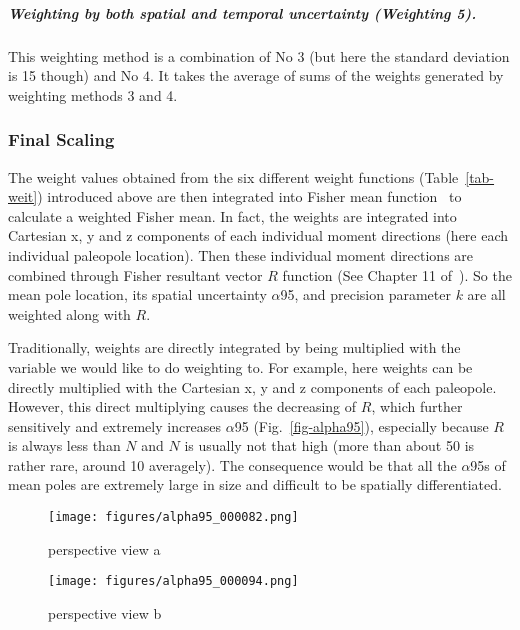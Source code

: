 \subparagraph{Weighting by both spatial and temporal uncertainty (Weighting 5).}
This weighting method is a combination of No $3$ (but here the standard
deviation is 15 though) and No $4$. It takes the average of sums of the weights
generated by weighting methods 3 and 4.

\subsubsection{Final Scaling}

The weight values obtained from the six different weight functions
(Table~\ref{tab-weit}) introduced above are then integrated into Fisher mean
function~\cite{F53} to calculate a weighted Fisher mean. In fact, the weights
are integrated into Cartesian x, y and z components of each individual moment
directions (here each individual paleopole location). Then these individual
moment directions are combined through Fisher resultant vector $R$ function (See
Chapter 11 of~\cite{T19}). So the mean pole location, its spatial uncertainty
$\alpha$95, and precision parameter $k$ are all weighted along with $R$.

Traditionally, weights are directly integrated by being multiplied with the
variable we would like to do weighting to. For example, here weights can be
directly multiplied with the Cartesian x, y and z components of each paleopole.
However, this direct multiplying causes the decreasing of $R$, which further
sensitively and extremely increases $\alpha$95 (Fig.~\ref{fig-alpha95}),
especially because $R$ is always less than $N$ and $N$ is usually not that high
(more than about 50 is rather rare, around 10 averagely). The consequence would
be that all the $\alpha$95s of mean poles are extremely large in size and
difficult to be spatially differentiated.

\begin{figure*}
	\centering
	\begin{subfigure}{.49\textwidth}
		\texttt{[image: figures/alpha95\_000082.png]}
		\caption{perspective view a}
	\end{subfigure}
	\begin{subfigure}{.49\textwidth}
		\texttt{[image: figures/alpha95\_000094.png]}
		\caption{perspective view b}
	\end{subfigure}
	\caption[ ]{Visualization of Equation 11.9 of Essentials of Paleomagnetism:
Fifth Web Edition, about the estimating of the circle of 95\% confidence
($p$=0.05) about the mean, $\alpha$95, from resultant vector $R$ and number of
directions (or paleopoles) $N$.}\label{fig-alpha95}
\end{figure*}

